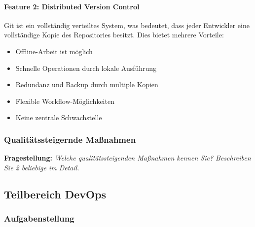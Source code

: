     \paragraph{Feature 2: Distributed Version Control}
    Git ist ein vollständig verteiltes System, was bedeutet, dass jeder Entwickler eine vollständige Kopie des Repositories besitzt.
    Dies bietet mehrere Vorteile:

    \begin{itemize}
        \item Offline-Arbeit ist möglich
        \item Schnelle Operationen durch lokale Ausführung
        \item Redundanz und Backup durch multiple Kopien
        \item Flexible Workflow-Möglichkeiten
        \item Keine zentrale Schwachstelle
    \end{itemize}






\subsubsection{Qualitätssteigernde Maßnahmen}

\textbf{Fragestellung:} \textit{Welche qualitätssteigenden Maßnahmen kennen Sie? Beschreiben Sie 2 beliebige im Detail.}    



\subsection{Teilbereich DevOps}

\subsubsection{Aufgabenstellung}

